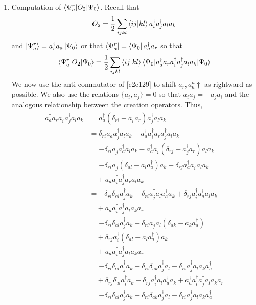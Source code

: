 \begin{enumerate}
\item\label{c2p31} Computation of $\braket{\Psi_a^r|O_2|\Psi_0}$.
Recall that
\[
O_2 = \frac{1}{2}\sum_{ijkl}\braket{ij|kl}a_i^\dagger a_j^\dagger a_l a_k
\]
and $\ket{\Psi_a^r} = a_r^\dagger a_a\ket{\Psi_0}$ or that $\bra{\Psi_a^r} = 
\bra{\Psi_0}a_a^\dagger a_r$ so that
\[
\braket{\Psi_a^r|O_2|\Psi_0} = \frac{1}{2}\sum_{ijkl}\braket{ij|kl}
\braket{\Psi_0|a_a^\dagger a_r a_i^\dagger a_j^\dagger a_l a_k|\Psi_0}
\]
We now use the anti-commutator of \eqref{c2e129} to shift $a_r, a_a^a\dagger$ as
rightward as possible. We also use the relations $\{a_i, a_j\} = 0$ so that
$a_ia_j = -a_ja_i$ and the analogous relationship between the creation operators.
Thus,
\[
\begin{aligned}
a_a^\dagger a_r a_i^\dagger a_j^\dagger a_l a_k &=
a_a^\dagger(\delta_{ri} - a_i^\dagger a_r)a_j^\dagger a_l a_k \\ 
&= \delta_{ri}a_a^\dagger a_j^\dagger a_l a_k - a_a^\dagger a_i^\dagger a_r
   a_j^\dagger a_l a_k \\
&= -\delta_{ri}a_j^\dagger a_a^\dagger a_l a_k - a_a^\dagger a_i^\dagger(
   \delta_{rj} - a_j^\dagger a_r)a_la_k \\
&= -\delta_{ri}a_j^\dagger(\delta_{al} - a_la_a^\dagger)a_k - \delta_{rj}
   a_a^\dagger a_i^\dagger a_l a_k \\
&\quad + a_a^\dagger a_i^\dagger a_j^\dagger a_ra_la_k \\
&= -\delta_{ri}\delta_{al}a_j^\dagger a_k + \delta_{ri}a_j^\dagger a_l 
   a_a^\dagger a_k + \delta_{rj}a_i^\dagger a_a^\dagger a_la_k \\
&\quad + a_a^\dagger a_i^\dagger a_j^\dagger a_la_ka_r \\
&= -\delta_{ri}\delta_{al}a_j^\dagger a_k + \delta_{ri}a_j^\dagger a_l(\delta_{ak}
   - a_ka_a^\dagger) \\
&\quad + \delta_{rj}a_i^\dagger(\delta_{al} - a_la_a^\dagger)a_k \\
&\quad + a_a^\dagger a_i^\dagger a_j^\dagger a_la_ka_r \\
&=  -\delta_{ri}\delta_{al}a_j^\dagger a_k + \delta_{ri}\delta_{ak}a_j^\dagger
 a_l - \delta_{ri}a_j^\dagger a_la_k a_a^\dagger \\
&\quad + \delta_{rj}\delta_{al}a_i^\dagger a_k - \delta_{rj}a_i^\dagger a_l
a_a^\dagger a_k + a_a^\dagger a_i^\dagger a_j^\dagger a_la_ka_r \\
&=  -\delta_{ri}\delta_{al}a_j^\dagger a_k + \delta_{ri}\delta_{ak}a_j^\dagger
 a_l - \delta_{ri}a_j^\dagger a_la_k a_a^\dagger \\

\end{aligned}\]
\end{enumerate}
